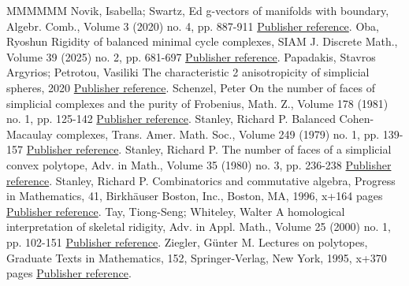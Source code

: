 \begin{thebibliography}{MMMMMM}
 Novik, Isabella; Swartz, Ed g-vectors of manifolds with boundary, Algebr. Comb., Volume 3 (2020) no. 4, pp. 887-911 \href{https://alco.centre-mersenne.org/articles/10.5802/alco.419/#NS20}{Publisher reference}.
 Oba, Ryoshun Rigidity of balanced minimal cycle complexes, SIAM J. Discrete Math., Volume 39 (2025) no. 2, pp. 681-697 \href{https://alco.centre-mersenne.org/articles/10.5802/alco.419/#Oba}{Publisher reference}.
 Papadakis, Stavros Argyrios; Petrotou, Vasiliki The characteristic 2 anisotropicity of simplicial spheres, 2020 \href{https://alco.centre-mersenne.org/articles/10.5802/alco.419/#PP}{Publisher reference}.
 Schenzel, Peter On the number of faces of simplicial complexes and the purity of Frobenius, Math. Z., Volume 178 (1981) no. 1, pp. 125-142 \href{https://alco.centre-mersenne.org/articles/10.5802/alco.419/#Sch81}{Publisher reference}.
 Stanley, Richard P. Balanced Cohen-Macaulay complexes, Trans. Amer. Math. Soc., Volume 249 (1979) no. 1, pp. 139-157 \href{https://alco.centre-mersenne.org/articles/10.5802/alco.419/#Sta79}{Publisher reference}.
 Stanley, Richard P. The number of faces of a simplicial convex polytope, Adv. in Math., Volume 35 (1980) no. 3, pp. 236-238 \href{https://alco.centre-mersenne.org/articles/10.5802/alco.419/#Sta80}{Publisher reference}.
 Stanley, Richard P. Combinatorics and commutative algebra, Progress in Mathematics, 41, Birkhäuser Boston, Inc., Boston, MA, 1996, x+164 pages \href{https://alco.centre-mersenne.org/articles/10.5802/alco.419/#Sta-book}{Publisher reference}.
 Tay, Tiong-Seng; Whiteley, Walter A homological interpretation of skeletal ridigity, Adv. in Appl. Math., Volume 25 (2000) no. 1, pp. 102-151 \href{https://alco.centre-mersenne.org/articles/10.5802/alco.419/#TW}{Publisher reference}.
 Ziegler, Günter M. Lectures on polytopes, Graduate Texts in Mathematics, 152, Springer-Verlag, New York, 1995, x+370 pages \href{https://alco.centre-mersenne.org/articles/10.5802/alco.419/#Zie}{Publisher reference}.
\end{thebibliography}
